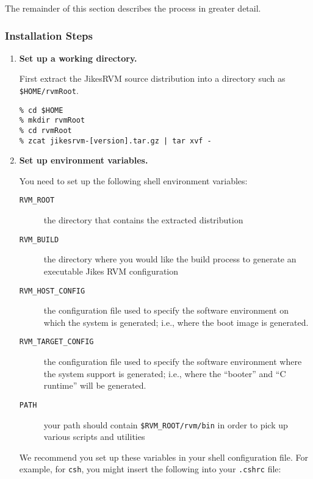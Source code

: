 The remainder of this section describes the process in greater detail.

\JikesTMFooter

\subsubsection{Installation Steps}

\begin{enumerate}
\item {\bf Set up a working directory.}

First extract the Jikes\trademark RVM source distribution into a
directory such as  
{\tt \$HOME/rvmRoot}.
\begin{verbatim}
% cd $HOME
% mkdir rvmRoot
% cd rvmRoot
% zcat jikesrvm-[version].tar.gz | tar xvf - 
\end{verbatim}

\item {\bf Set up environment variables.}

You need to set up the following shell environment variables:

\begin{description}
\item [{\tt RVM\_ROOT}] the directory that contains the extracted
distribution 
\item [{\tt RVM\_BUILD}] the directory where you would like the build
process to generate an executable Jikes RVM configuration

\item [{\tt RVM\_HOST\_CONFIG}] the configuration file used to specify
the software environment on which the system is generated; i.e., where the
boot image is generated.

\item [{\tt RVM\_TARGET\_CONFIG}] the configuration file used to specify
the software environment where the system support is generated; i.e., where
the ``booter'' and ``C runtime'' will be generated.

\item[{\tt PATH}] your path should contain {\tt \$RVM\_ROOT/rvm/bin} in
order to pick up various scripts and utilities
\end{description}

We recommend you set up these variables in your shell configuration
file.  For example, for {\tt csh}, you might insert the
following into your {\tt .cshrc} file:


\end{enumerate}
